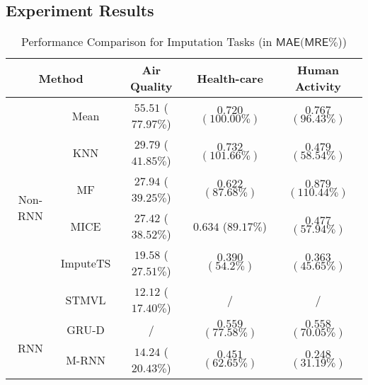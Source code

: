 \documentclass{article}
\begin{document}
\subsection{Experiment Results}
\begin{table}[t!]
\centering
\renewcommand\arraystretch{1.2}
\caption{Performance Comparison for Imputation Tasks (in $\mathsf{MAE} (\mathsf{MRE}\%$))}
\label{tab:imputation}
\begin{tabular}{c|c|c|c|c}
\toprule[1.6pt]
\multicolumn{2}{c|}{Method}                                            & Air Quality & Health-care                           & Human Activity                        \\ \hline
\multirow{6}{*}{Non-RNN} & Mean                                         & $55.51$ ($77.97\%$)                           & $0.720$ $(100.00\%)$                  & $0.767$ $(96.43\%)$                   \\ \cline{2-5} 
                         & KNN                                          & $29.79$ ($41.85\%$)                           & $0.732$ $(101.66\%)$                  & $0.479$ $(58.54\%)$                   \\ \cline{2-5} 
                         & MF                                           & $27.94$ ($39.25\%$)                           & $0.622$ $(87.68\%)$                   & $0.879$ $(110.44\%)$                  \\ \cline{2-5} 
                         & MICE                                         & $27.42$ ($38.52\%$)                           & $0.634$ ($89.17\%$)                   & $0.477$ $(57.94\%)$                   \\ \cline{2-5} 
                         & ImputeTS                                     & $19.58$ ($27.51\%$)                           & $0.390$ $(54.2\%)$                    & $0.363$ $(45.65\%)$                   \\ \cline{2-5} 
                         & STMVL                                        & $12.12$ ($17.40\%$)                           & /                                     & /                                     \\ \hline
\multirow{2}{*}{RNN}     & GRU-D                                        & /                                             & $0.559$ $(77.58\%)$                   & $0.558$ $(70.05\%)$                   \\ \cline{2-5} 
                         & M-RNN                                        & $14.24$ ($20.43\%$)                           & $0.451$ $(62.65\%)$                   & $0.248$ $(31.19\%)$                   \\ \hline

\end{tabular}
\end{table}
\end{document}
